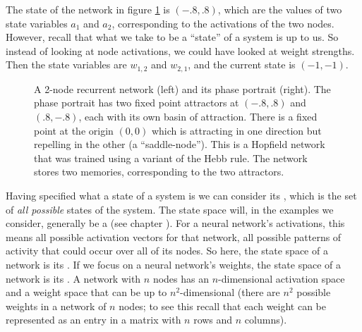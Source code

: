 The state of the network in figure \ref{F:hopfieldStateSpace} is $(-.8,.8)$, which are the values of two state variables $a_1$ and $a_2$, corresponding to the activations of the two nodes. However, recall that what we take to be a ``state'' of a system is up to us. So instead of looking at node activations, we could have looked at weight strengths. Then the state variables are $w_{1,2}$ and $w_{2,1}$, and the current state is  $(-1,-1)$.

\begin{figure}[h]
\centering
{}
\hspace*{1in}
\caption[Left: Simbrain screenshot; Right: Jeff Yoshimi.]{A 2-node recurrent network (left) and its phase portrait (right). The phase portrait has two fixed point attractors at $(-.8,.8)$ and $(.8,-.8)$, each with its own basin of attraction. There is a fixed point at the origin $(0,0)$ which is attracting in one direction but repelling in the other (a ``saddle-node''). This is a Hopfield network that was trained using a variant of the Hebb rule. The network stores two memories, corresponding to the two attractors.}
\label{F:hopfieldStateSpace}
\end{figure}

  Having specified what a state of a system is we can consider its  , which is the set of  {\em all  possible} states of the system. The state space will, in the examples we consider, generally be a  (see chapter ). For a neural network's activations, this means all possible activation vectors for that  network, all possible patterns of activity that could occur over all of its  nodes. So here, the state space of a network is its . If we focus on a neural network's weights, the state space of a network is  its . A network with $n$ nodes has an $n$-dimensional activation space and a weight space that can be up to $n^2$-dimensional (there are $n^2$ possible weights in a network of $n$ nodes; to see this recall that each weight can be represented as an entry in a matrix with $n$ rows and $n$ columns).

